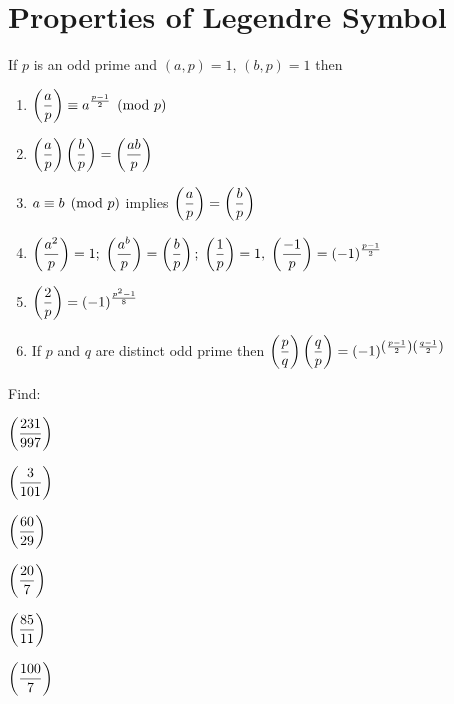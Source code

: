 \documentclass[12pt]{book}
\begin{document}
\section*{Properties of Legendre Symbol}
\begin{thm}
    If $ p $ is an odd prime and $ (a,p)=1 $, $ (b,p)=1 $ then
    \begin{enumerate}[label=(\roman*)]
        \item $ \displaystyle \left( \frac{a}{p} \right)\equiv a^{\frac{p-1}{2}} \pmod{p} $
        \item $ \displaystyle \left( \frac{a}{p} \right)\left( \frac{b}{p} \right)=\left( \frac{ab}{p} \right)$
        \item $ a\equiv b \pmod{p} $ implies $ \displaystyle \left( \frac{a}{p} \right)=\left( \frac{b}{p} \right)$
        \item $ \displaystyle \left( \frac{a^2}{p} \right)=1;\;\left( \frac{a^b}{p} \right)=\left( \frac{b}{p} \right);\;\left( \frac{1}{p} \right)=1,\;\left( \frac{-1}{p} \right)=(-1)^{\frac{p-1}{2}}$
        \item $ \displaystyle \left( \frac{2}{p} \right)=(-1)^{\frac{p^2-1}{8}}$
        \item If $ p $ and $ q $ are distinct odd prime then $ \displaystyle \left( \frac{p}{q} \right)\left( \frac{q}{p} \right)=(-1)^{\left( \frac{p-1}{2} \right)\left( \frac{q-1}{2} \right)}$
    \end{enumerate}
\end{thm}
\begin{qn}
    Find:
    \begin{enumerate*}
        \item $ \displaystyle \left( \frac{231}{997} \right) $
        \item $ \displaystyle \left( \frac{3}{101} \right) $
        \item $ \displaystyle \left( \frac{60}{29} \right) $
        \item $ \displaystyle \left( \frac{20}{7} \right) $
        \item $ \displaystyle \left( \frac{85}{11} \right) $
        \item $ \displaystyle \left( \frac{100}{7} \right) $
    \end{enumerate*}
\end{qn}
\end{document}
